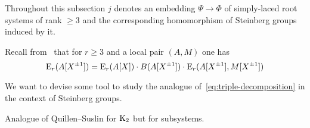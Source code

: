 Throughout this subsection $j$ denotes an embedding $\Psi \to \Phi$ of simply-laced root systems of rank $\geq 3$ and the corresponding
 homomorphism of Steinberg groups induced by it.

Recall from~\cite[\S~4]{Su77} that for $r \geq 3$ and a local pair $(A, M)$ one has
\begin{equation}\label{eq:triple-decomposition}
\operatorname{E}_r(A[X^{\pm 1}]) = \operatorname{E}_r(A[X]) \cdot B(A[X^{\pm 1}]) \cdot \operatorname{E}_r(A[X^{\pm 1}], M[X^{\pm 1}])
\end{equation}

We want to devise some tool to study the analogue of~\eqref{eq:triple-decomposition} in the context of Steinberg groups.


\begin{lemma} \label{lem:qs-b}
  Analogue of Quillen--Suslin for $\operatorname{K}_2$ but for subsystems.
\end{lemma}

